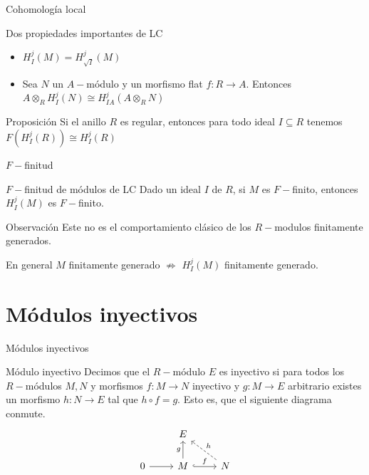 \documentclass{beamer}
\begin{document}
\begin{frame}[fragile]{Cohomología local}
\begin{block}{Dos propiedades importantes de LC}
\begin{itemize}
  \item $H^j_I(M) = H^j_{\sqrt{I} }(M)$ 
  \item Sea $N$ un $A-$módulo y un morfismo flat $f:R\to A$. Entonces $A\otimes _RH^j_I(N) \cong H_{IA}^j(A\otimes_R N)$
\end{itemize}
\end{block}
\begin{block}{Proposición}
 Si el anillo $R$ es regular, entonces para todo ideal $I\subseteq R$ tenemos $F(H_I^j(R)) \cong  H_{I}^j(R)$
\end{block}
\end{frame}


\begin{frame}[fragile]{$F-$finitud}
  \begin{block}{$F-$finitud de módulos de LC}
Dado un ideal $I$ de $R$, si $M$ es $F-$finito, entonces $H^j_I(M)$ es $F-$finito.
\end{block}
  \begin{block}{Observación}
	Este no es el comportamiento clásico de los $R-$modulos finitamente generados. 

	En general $M$ finitamente generado  $\nRightarrow $ $H_I^j(M)$ finitamente generado.
\end{block}
\end{frame}

\section{Módulos inyectivos}


\begin{frame}[fragile]{Módulos inyectivos}
\begin{block}{Módulo inyectivo}
  Decimos que el $R-$módulo  $E$ es inyectivo si para todos los  $R-$módulos  $M, N$ y morfismos $f:M\to N$ inyectivo y $g:M\to E$ arbitrario existes un morfismo $h:N\to E$ tal que $h\circ f=g$. Esto es, que el siguiente diagrama conmute.
\[\begin{tikzcd}
	& E \\
	0 & M & N
	\arrow[from=2-1, to=2-2]
	\arrow["g", from=2-2, to=1-2]
	\arrow["f", hook, from=2-2, to=2-3]
	\arrow["h"', dashed, from=2-3, to=1-2]
\end{tikzcd}\]
\end{block}
\end{frame}
\end{document}

